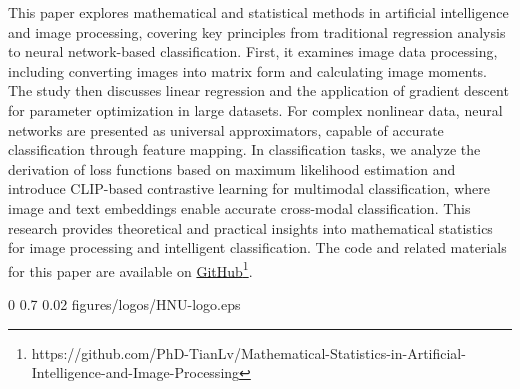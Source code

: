 \documentclass[
    report,     %
    oneside,    %
    UTF8,       %
    zihao=-4    %
]{config} %
\begin{document}

\begin{abstractEN}[0.6cm] %

This paper explores mathematical and statistical methods in artificial intelligence and image processing, covering key principles from traditional regression analysis to neural network-based classification. First, it examines image data processing, including converting images into matrix form and calculating image moments. The study then discusses linear regression and the application of gradient descent for parameter optimization in large datasets. For complex nonlinear data, neural networks are presented as universal approximators, capable of accurate classification through feature mapping. In classification tasks, we analyze the derivation of loss functions based on maximum likelihood estimation and introduce CLIP-based contrastive learning for multimodal classification, where image and text embeddings enable accurate cross-modal classification. This research provides theoretical and practical insights into mathematical statistics for image processing and intelligent classification. The code and related materials for this paper are available on \href{https://github.com/PhD-TianLv/Mathematical-Statistics-in-Artificial-Intelligence-and-Image-Processing}{GitHub}\footnote{https://github.com/PhD-TianLv/Mathematical-Statistics-in-Artificial-Intelligence-and-Image-Processing}.

\def\keywordsEN{Artificial Intelligence; Image Processing; Mathematical Statistics; Neural Networks}

\end{abstractEN}




\imageWatermark %
    {0} %
    {0.7} %
    {0.02} %
    {figures/logos/HNU-logo.eps} %

\end{document}
